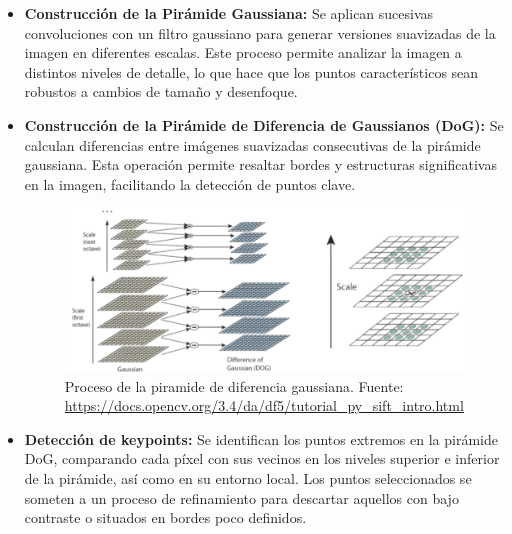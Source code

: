 \documentclass[a4paper]{article}
\begin{document}
  \begin{itemize}
      \item \textbf{Construcción de la Pirámide Gaussiana:}  
      Se aplican sucesivas convoluciones con un filtro gaussiano para generar versiones suavizadas de la imagen en diferentes escalas. Este proceso permite analizar la imagen a distintos niveles de detalle, lo que hace que los puntos característicos sean robustos a cambios de tamaño y desenfoque.
      
      \item \textbf{Construcción de la Pirámide de Diferencia de Gaussianos (DoG):}  
      Se calculan diferencias entre imágenes suavizadas consecutivas de la pirámide gaussiana. Esta operación permite resaltar bordes y estructuras significativas en la imagen, facilitando la detección de puntos clave.
      
      \begin{figure}[H]
        \centering
        \includegraphics[width=1.1\textwidth]{images/sift_gauss.png}
        \caption{Proceso de la piramide de diferencia gaussiana. Fuente: \url{https://docs.opencv.org/3.4/da/df5/tutorial_py_sift_intro.html}}
    \end{figure}
    
      \item \textbf{Detección de keypoints:}  
      Se identifican los puntos extremos en la pirámide DoG, comparando cada píxel con sus vecinos en los niveles superior e inferior de la pirámide, así como en su entorno local. Los puntos seleccionados se someten a un proceso de refinamiento para descartar aquellos con bajo contraste o situados en bordes poco definidos.
      

\end{itemize}
\end{document}
